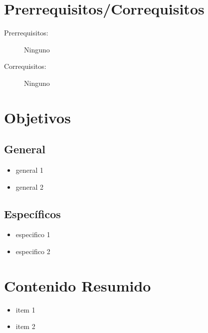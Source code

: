 \documentclass[11pt]{article}
\begin{document}
\section*{Prerrequisitos/Correquisitos}
\begin{description}
\item [Prerrequisitos:] Ninguno
\item[Correquisitos:] Ninguno
\end{description}

\section*{Objetivos}

\subsection*{General}

\begin{itemize}
\item general 1 \item general 2  
\end{itemize}

\subsection*{Específicos}

\begin{itemize}
\item especifico 1 \item especifico 2 
\end{itemize}

\section*{Contenido Resumido}

\begin{itemize}
\item item 1 \item  item 2  
\end{itemize}

\end{document}
